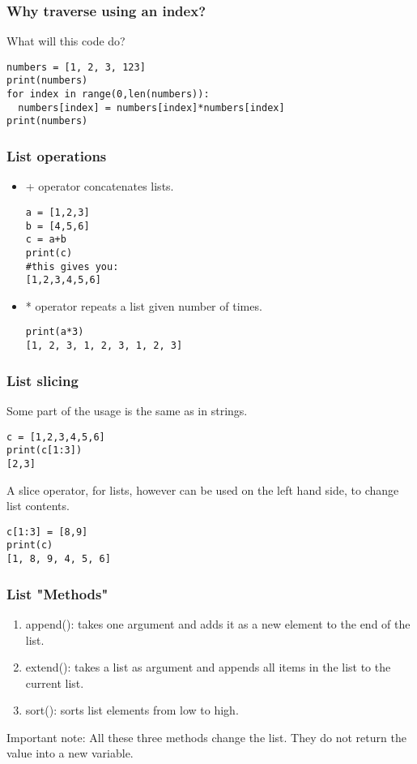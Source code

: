 \documentclass{beamer}
\begin{document}
\begin{frame}[fragile]
\frametitle{Why traverse using an index?}
What will this code do?
\begin{verbatim}
numbers = [1, 2, 3, 123]
print(numbers)
for index in range(0,len(numbers)):
  numbers[index] = numbers[index]*numbers[index]
print(numbers)
\end{verbatim}
\end{frame}

\begin{frame}[fragile]
\frametitle{List operations}
\begin{itemize}
\item + operator concatenates lists.
\begin{verbatim}
a = [1,2,3]
b = [4,5,6]
c = a+b
print(c)
#this gives you:
[1,2,3,4,5,6]
\end{verbatim}
\item * operator repeats a list given number of times.
\begin{verbatim}
print(a*3)
[1, 2, 3, 1, 2, 3, 1, 2, 3]
\end{verbatim}
\end{itemize}
\end{frame}

\begin{frame}[fragile]
\frametitle{List slicing}
Some part of the usage is the same as in strings.
\begin{verbatim}
c = [1,2,3,4,5,6]
print(c[1:3])
[2,3]
\end{verbatim} \pause
\medskip 
A slice operator, for lists, however can be used on the left hand side, to change list contents.
\begin{verbatim}
c[1:3] = [8,9]
print(c)
[1, 8, 9, 4, 5, 6]
\end{verbatim}
\end{frame}

\begin{frame}[fragile]
\frametitle{List "Methods"}
\begin{enumerate}
\item append(): takes one argument and adds it as a new element to the end of the list. 
\item extend(): takes a list as argument and appends all items in the list to the current list. 
\item sort(): sorts list elements from low to high.
\end{enumerate}
Important note: All these three methods change the list. They do not return the value into a new variable.
\end{frame}
\end{document}
